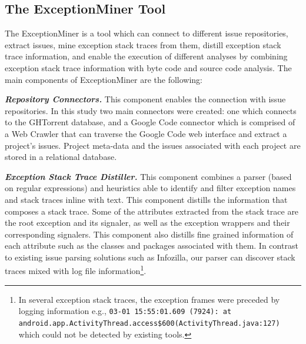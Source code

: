 \subsection{The ExceptionMiner Tool}
\label{sec:exceptionminer}

The ExceptionMiner is a tool which can connect to different issue repositories,
extract issues, mine exception stack traces from them, distill exception stack trace information,
and enable the execution of different analyses by combining exception stack
trace information with byte code and source code analysis. The main components of ExceptionMiner are the following:

\emph{\textbf{Repository Connectors.}} This component enables the connection
with issue repositories. In this study two main connectors were created: one which connects to
the GHTorrent database, and a Google Code connector which is comprised of a Web Crawler
 that can traverse the Google Code web interface and extract a project's issues.
Project meta-data and the issues associated with each project are stored in a relational
database.

\emph{\textbf{Exception Stack Trace Distiller.}}
This component combines a parser (based on regular expressions)
and heuristics able to identify and filter exception names and stack traces inline with text.
This component distills the information that composes a stack trace.
 Some of the attributes extracted from the stack trace are
 the root exception and its signaler, as well as the exception wrappers and their corresponding signalers.
This component also distills fine grained information of each attribute such as the classes and packages associated with them.
In contrast to existing issue parsing solutions such as Infozilla, our parser
 can discover stack traces mixed with log file information\footnote{In several
exception stack traces, the exception frames were preceded by logging information e.g.,
\texttt{03-01 15:55:01.609 (7924): at android.app.ActivityThread.access\$600(ActivityThread\-.java:127)} which could not be detected by existing tools.}.

